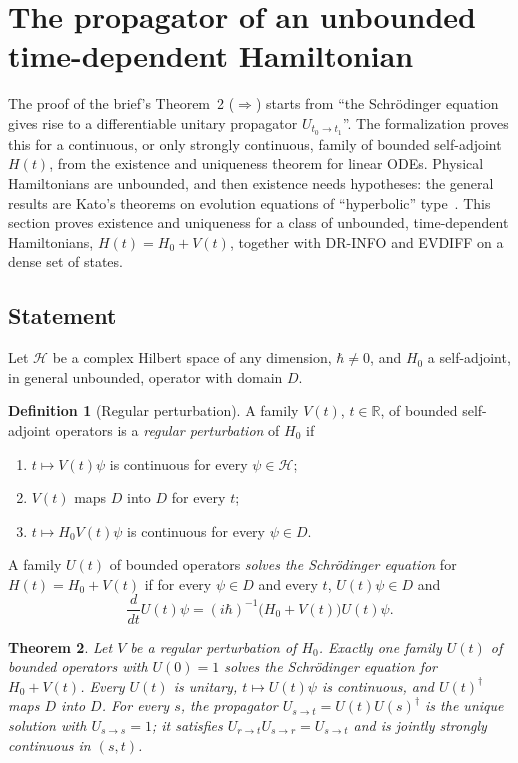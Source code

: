 \documentclass[11pt]{article}
\newtheorem{theorem}{Theorem}[section]
\theoremstyle{definition}
\newtheorem{definition}[theorem]{Definition}
\theoremstyle{remark}
\begin{document}
\section{The propagator of an unbounded time-dependent Hamiltonian}
\label{sec:perturbed}

The proof of the brief's Theorem~2 ($\Rightarrow$) starts from ``the Schr\"odinger equation gives
rise to a differentiable unitary propagator $U_{t_0\to t_1}$''. The formalization proves this
for a continuous, or only strongly continuous, family of bounded self-adjoint $H(t)$, from the
existence and uniqueness theorem for linear ODEs. Physical Hamiltonians are unbounded, and then
existence needs hypotheses: the general results are Kato's theorems on evolution equations of
``hyperbolic'' type~\cite{kato,pazy}. This section proves existence and uniqueness for a class
of unbounded, time-dependent Hamiltonians, $H(t) = H_0 + V(t)$, together with DR-INFO and EVDIFF
on a dense set of states.

\subsection{Statement}

Let $\mathcal H$ be a complex Hilbert space of any dimension, $\hbar \ne 0$, and $H_0$ a
self-adjoint, in general unbounded, operator with domain $D$.

\begin{definition}[Regular perturbation]\label{def:regular}
  A family $V(t)$, $t\in\mathbb R$, of bounded self-adjoint operators is a \emph{regular
  perturbation} of $H_0$ if
  \begin{enumerate}
    \item[(a)] $t\mapsto V(t)\psi$ is continuous for every $\psi\in\mathcal H$;
    \item[(b)] $V(t)$ maps $D$ into $D$ for every $t$;
    \item[(c)] $t\mapsto H_0V(t)\psi$ is continuous for every $\psi\in D$.
  \end{enumerate}
\end{definition}

A family $U(t)$ of bounded operators \emph{solves the Schr\"odinger equation} for $H(t) = H_0 +
V(t)$ if for every $\psi\in D$ and every $t$, $U(t)\psi\in D$ and
\[
  \frac{d}{dt}U(t)\psi = (i\hbar)^{-1}\bigl(H_0 + V(t)\bigr)U(t)\psi.
\]

\begin{theorem}\label{thm:perturbed}
  Let $V$ be a regular perturbation of $H_0$. Exactly one family $U(t)$ of bounded operators with
  $U(0) = 1$ solves the Schr\"odinger equation for $H_0 + V(t)$. Every $U(t)$ is unitary,
  $t\mapsto U(t)\psi$ is continuous, and $U(t)^\dagger$ maps $D$ into $D$. For every $s$, the
  propagator $U_{s\to t} = U(t)U(s)^\dagger$ is the unique solution with $U_{s\to s} = 1$; it
  satisfies $U_{r\to t}U_{s\to r} = U_{s\to t}$ and is jointly strongly continuous in $(s, t)$.
\end{theorem}
\end{document}
